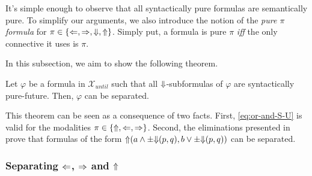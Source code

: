 \documentclass[a4paper,UKenglish,cleveref, autoref, thm-restate, numberwithinsect]{lipics-v2021}
\def\Larrow{\ensuremath\mathord{\Leftarrow}}
\def\Rarrow{\ensuremath\mathord{\Rightarrow}}
\def\Uarrow{\ensuremath\mathord{\Uparrow}}
\def\Darrow{\ensuremath\mathord{\Downarrow}}
\begin{document}
It's simple enough to observe that all syntactically pure formulas are semantically pure. To simplify our arguments, we also introduce the notion of the \textit{pure $\pi$ formula} for $\pi \in \{ \Larrow, \Rarrow, \Darrow, \Uarrow \}$. Simply put, a formula is pure $\pi$ \textit{iff} the only connective it uses is $\pi$.

In this subsection, we aim to show the following theorem.
\begin{theorem}
    \label{theorem:partial-separation-trees}
    Let $\varphi$ be a formula in $\mathcal{X}_{until}$ such that all $\Darrow$-subformulas of $\varphi$ are syntactically pure-future. Then, $\varphi$ can be separated.
\end{theorem}
This theorem can be seen as a consequence of two facts. First, \eqref{eq:or-and-S-U} is valid for the modalities $\pi \in \{\Uarrow, \Larrow, \Rarrow\}$. Second, the eliminations presented in \cite{xpathComplete} prove that formulas of the form $\Uarrow(a \land \pm \Darrow(p, q), b \lor \pm \Darrow(p, q))$ can be separated.

\subsubsection{Separating $\Larrow$, $\Rarrow$ and $\Uarrow$}
\end{document}
